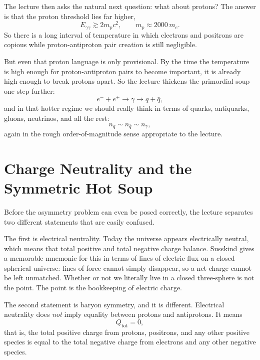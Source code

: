 The lecture then asks the natural next question: what about protons? The answer is that the proton threshold lies far higher,
\begin{equation}
E_{\gamma\gamma} \gtrsim 2m_p c^2,
\qquad
m_p \approx 2000\,m_e.
\end{equation}
So there is a long interval of temperature in which electrons and positrons are copious while proton-antiproton pair creation is still negligible.

But even that proton language is only provisional. By the time the temperature is high enough for proton-antiproton pairs to become important, it is already high enough to break protons apart. So the lecture thickens the primordial soup one step further:
\begin{equation}
e^- + e^+ \to \gamma \to q + \bar q,
\end{equation}
and in that hotter regime we should really think in terms of quarks, antiquarks, gluons, neutrinos, and all the rest:
\begin{equation}
n_q \sim n_{\bar q} \sim n_\gamma,
\end{equation}
again in the rough order-of-magnitude sense appropriate to the lecture.

\section{Charge Neutrality and the Symmetric Hot Soup}

Before the asymmetry problem can even be posed correctly, the lecture separates two different statements that are easily confused.

The first is electrical neutrality. Today the universe appears electrically neutral, which means that total positive and total negative charge balance. Susskind gives a memorable mnemonic for this in terms of lines of electric flux on a closed spherical universe: lines of force cannot simply disappear, so a net charge cannot be left unmatched. Whether or not we literally live in a closed three-sphere is not the point. The point is the bookkeeping of electric charge.

The second statement is baryon symmetry, and it is different. Electrical neutrality does \emph{not} imply equality between protons and antiprotons. It means
\begin{equation}
Q_{\mathrm{tot}}=0,
\end{equation}
that is, the total positive charge from protons, positrons, and any other positive species is equal to the total negative charge from electrons and any other negative species.

